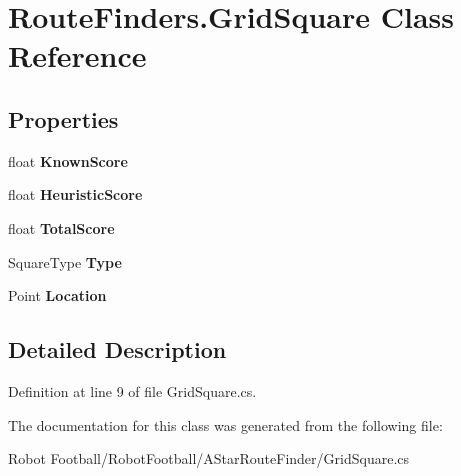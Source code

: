 \hypertarget{class_route_finders_1_1_grid_square}{\section{Route\-Finders.\-Grid\-Square Class Reference}
\label{class_route_finders_1_1_grid_square}
}
\subsection*{Properties}
\begin{DoxyCompactItemize}
\item 
\hypertarget{class_route_finders_1_1_grid_square_a537e48c2acaf5f272de095efc714f043}{float {\bfseries Known\-Score}}\label{class_route_finders_1_1_grid_square_a537e48c2acaf5f272de095efc714f043}

\item 
\hypertarget{class_route_finders_1_1_grid_square_a6b64d6300f321685a6fb0b7009ae10e5}{float {\bfseries Heuristic\-Score}}\label{class_route_finders_1_1_grid_square_a6b64d6300f321685a6fb0b7009ae10e5}

\item 
\hypertarget{class_route_finders_1_1_grid_square_ad10436dd0a72f807c510db7a86a946e6}{float {\bfseries Total\-Score}}\label{class_route_finders_1_1_grid_square_ad10436dd0a72f807c510db7a86a946e6}

\item 
\hypertarget{class_route_finders_1_1_grid_square_a79788bc8f886ec21cde15b55dd594262}{Square\-Type {\bfseries Type}}\label{class_route_finders_1_1_grid_square_a79788bc8f886ec21cde15b55dd594262}

\item 
\hypertarget{class_route_finders_1_1_grid_square_aeb1780cbda4b3ca6d8ec5a59f5017d61}{Point {\bfseries Location}}\label{class_route_finders_1_1_grid_square_aeb1780cbda4b3ca6d8ec5a59f5017d61}

\end{DoxyCompactItemize}


\subsection{Detailed Description}


Definition at line 9 of file Grid\-Square.\-cs.



The documentation for this class was generated from the following file\-:\begin{DoxyCompactItemize}
\item 
Robot Football/\-Robot\-Football/\-A\-Star\-Route\-Finder/Grid\-Square.\-cs\end{DoxyCompactItemize}

